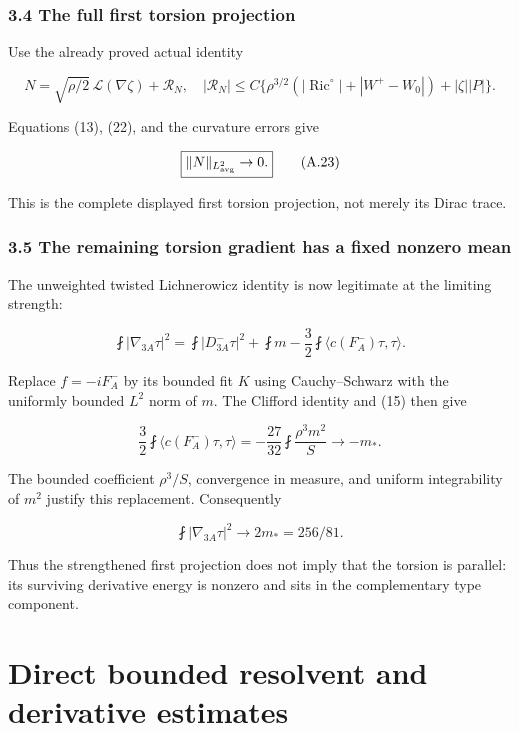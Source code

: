 \documentclass[11pt]{article}
\begin{document}
\hypertarget{the-full-first-torsion-projection}{%
\subsubsection{3.4 The full first torsion
projection}\label{the-full-first-torsion-projection}}

Use the already proved actual identity

\[
 N=\sqrt{\rho/2}\,\mathcal L(\nabla\zeta)+\mathcal R_N,
\quad
 |\mathcal R_N|\le C\{\rho^{3/2}(
 |\operatorname{Ric}^{\circ}|+|W^+-W_0|)+|\zeta||P|\}.
\]

Equations (13), (22), and the curvature errors give

\[
 \boxed{\|N\|_{L^2_{\rm avg}}\to0.}\tag{A.23}
\]

This is the complete displayed first torsion projection, not merely its
Dirac trace.

\hypertarget{the-remaining-torsion-gradient-has-a-fixed-nonzero-mean}{%
\subsubsection{3.5 The remaining torsion gradient has a fixed nonzero
mean}\label{the-remaining-torsion-gradient-has-a-fixed-nonzero-mean}}

The unweighted twisted Lichnerowicz identity is now legitimate at the
limiting strength:

\[
 \fint|\nabla_{3A}\tau|^2
 =\fint|D^-_{3A}\tau|^2+\fint m
       -\frac32\fint\langle c(F_A^-)\tau,\tau\rangle.
\]

Replace \(f=-iF_A^-\) by its bounded fit \(K\) using Cauchy--Schwarz
with the uniformly bounded \(L^2\) norm of \(m\). The Clifford identity
and (15) then give

\[
 \frac32\fint\langle c(F_A^-)\tau,\tau\rangle
 =-\frac{27}{32}\fint\frac{\rho^3m^2}{S}
 \longrightarrow-m_*.
\]

The bounded coefficient \(\rho^3/S\), convergence in measure, and
uniform integrability of \(m^2\) justify this replacement. Consequently

\[
 \boxed{\fint|\nabla_{3A}\tau|^2\longrightarrow
              2m_* =256/81.}\tag{A.25}
\]

Thus the strengthened first projection does not imply that the torsion
is parallel: its surviving derivative energy is nonzero and sits in the
complementary type component.
\clearpage
\hypertarget{direct-bounded-resolvent-and-derivative-estimates}{%
\section{Direct bounded resolvent and derivative
estimates}\label{direct-bounded-resolvent-and-derivative-estimates}}
\end{document}

